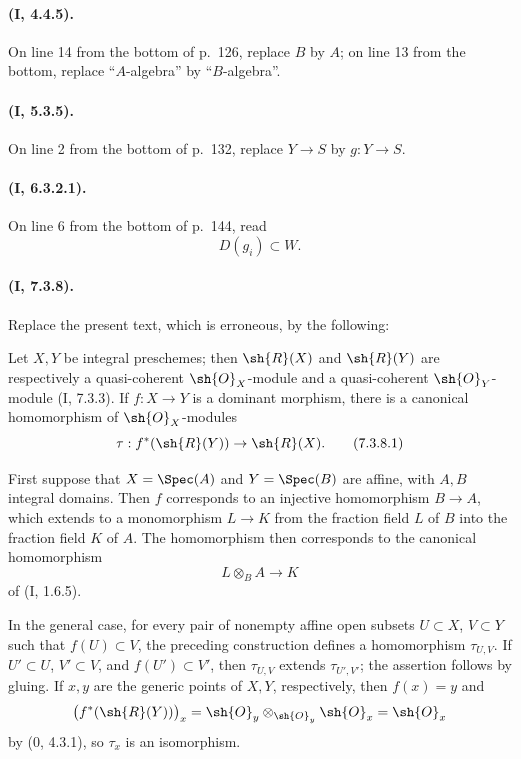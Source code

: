 \paragraph{(I, 4.4.5).}
On line 14 from the bottom of p.~126, replace $B$ by $A$; on line 13
from the bottom, replace ``$A$-algebra'' by ``$B$-algebra''.

\paragraph{(I, 5.3.5).}
On line 2 from the bottom of p.~132, replace $Y\to S$ by
$g:Y\to S$.

\paragraph{(I, 6.3.2.1).}
On line 6 from the bottom of p.~144, read
\[
  D(g_i)\subset W.
\]

\paragraph{(I, 7.3.8).}
Replace the present text, which is erroneous, by the following:

Let $X,Y$ be integral preschemes; then $\sh{R}(X)$ and $\sh{R}(Y)$
are respectively a quasi-coherent $\sh{O}_X$-module and a
quasi-coherent $\sh{O}_Y$-module (I, 7.3.3).  If
$f:X\to Y$ is a dominant morphism, there is a canonical homomorphism
of $\sh{O}_X$-modules
\begin{equation}
\label{I.7.3.8.1}
  \tau:f^*(\sh{R}(Y))\to\sh{R}(X).
\tag{7.3.8.1}
\end{equation}

First suppose that $X=\Spec(A)$ and $Y=\Spec(B)$ are affine, with
$A,B$ integral domains.  Then $f$ corresponds to an injective
homomorphism $B\to A$, which extends to a monomorphism
$L\to K$ from the fraction field $L$ of $B$ into the fraction field
$K$ of $A$.  The homomorphism  then corresponds to the
canonical homomorphism
\[
  L\otimes_B A\to K
\]
of (I, 1.6.5).

In the general case, for every pair of nonempty affine open subsets
$U\subset X$, $V\subset Y$ such that $f(U)\subset V$, the preceding
construction defines a homomorphism $\tau_{U,V}$.  If
$U'\subset U$, $V'\subset V$, and $f(U')\subset V'$, then
$\tau_{U,V}$ extends $\tau_{U',V'}$; the assertion follows by gluing.
If $x,y$ are the generic points of $X,Y$, respectively, then
$f(x)=y$ and
\[
  \bigl(f^*(\sh{R}(Y))\bigr)_x
  =\sh{O}_y\otimes_{\sh{O}_y}\sh{O}_x
  =\sh{O}_x
\]
by (0, 4.3.1), so $\tau_x$ is an isomorphism.

